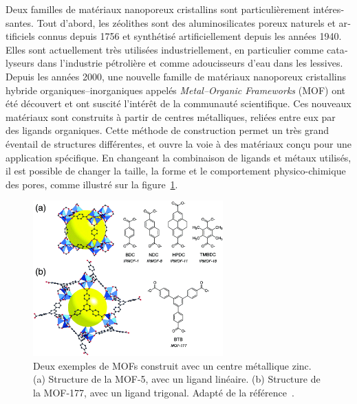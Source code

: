 \documentclass[thesis]{subfiles}
\begin{document}
\begin{otherlanguage}{french}
Deux familles de matériaux nanoporeux cristallins sont particulièrement
intéressantes. Tout d'abord, les zéolithes sont des aluminosilicates poreux
naturels et artificiels connus depuis 1756 et synthétisé artificiellement depuis
les années 1940. Elles sont actuellement très utilisées industriellement, en
particulier comme catalyseurs dans l'industrie pétrolière et comme adoucisseurs
d'eau dans les lessives. Depuis les années 2000, une nouvelle famille de
matériaux nanoporeux cristallins hybride organiques--inorganiques appelés
\emph{Metal--Organic Frameworks} (MOF) ont été découvert et ont suscité
l'intérêt de la communauté scientifique. Ces nouveaux matériaux sont construits
à partir de centres métalliques, reliées entre eux par des ligands organiques.
Cette méthode de construction permet un très grand éventail de structures
différentes, et ouvre la voie à des matériaux conçu pour une application
spécifique. En changeant la combinaison de ligands et métaux utilisés, il est
possible de changer la taille, la forme et le comportement physico-chimique des
pores, comme illustré sur la figure~\ref{fig:fr:mof-different-linkers}.

\begin{figure}[ht]
    \centering
    \includegraphics[width=0.65\textwidth]{figures/cited/mof-different-linker}
    \caption{Deux exemples de MOFs construit avec un centre métallique zinc.
    (a) Structure de la MOF-5, avec un ligand linéaire. (b) Structure de la
    MOF-177, avec un ligand trigonal. Adapté de la référence~\cite{Rowsell2004}.}
    \label{fig:fr:mof-different-linkers}
\end{figure}


\end{otherlanguage}
\end{document}
